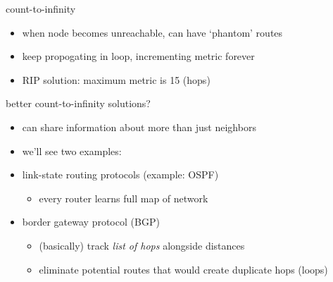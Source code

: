 \begin{frame}{count-to-infinity}
    \begin{itemize}
    \item when node becomes unreachable, can have `phantom' routes
    \item keep propogating in loop, incrementing metric forever
    \vspace{.5cm}
    \item RIP solution: maximum metric is 15 (hops)
    \end{itemize}
\end{frame}

\begin{frame}{better count-to-infinity solutions?}
    \begin{itemize}
    \item can share information about more than just neighbors
    \vspace{.5cm}
    \item we'll see two examples:
    \item link-state routing protocols (example: OSPF)
        \begin{itemize}
        \item every router learns full map of network
        \end{itemize}
    \item border gateway protocol (BGP)
        \begin{itemize}
        \item (basically) track \textit{list of hops} alongside distances
        \item eliminate potential routes that would create duplicate hops (loops)
        \end{itemize}
    \end{itemize}
\end{frame}
